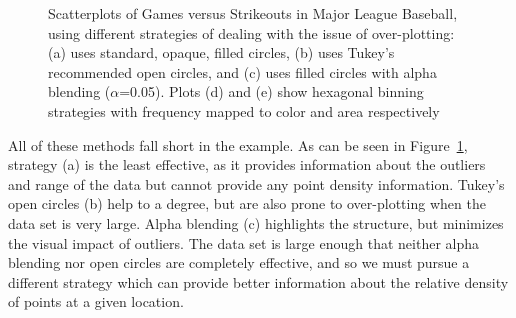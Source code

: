 \documentclass[11pt]{isuthesis}\usepackage[]{graphicx}\usepackage[]{color}
\begin{document}
\begin{figure}[hbtp]

	\caption{\label{fig:scatter-alpha} Scatterplots of Games versus Strikeouts in Major League Baseball, using different strategies of dealing with the issue of over-plotting:  (a) uses standard, opaque, filled circles, (b)  uses Tukey's recommended open circles, and (c) uses filled circles with alpha blending ($\alpha$=0.05). Plots (d) and (e) show hexagonal binning strategies with frequency mapped to color and area respectively}
\end{figure}

All of these methods fall short in the example.
As can be seen in Figure~\ref{fig:scatter-alpha}, strategy (a) is the least effective, as it provides information about the outliers and range of the data but cannot provide any point density information. Tukey's open circles (b) help to a degree, but are also prone to over-plotting  when the data set is very large. Alpha blending (c) highlights the structure, but minimizes the visual impact of outliers. The data set is large enough that neither alpha blending nor open circles are completely effective, and so we must pursue a different strategy which can provide better information about the relative density of points at a given location.
\end{document}
